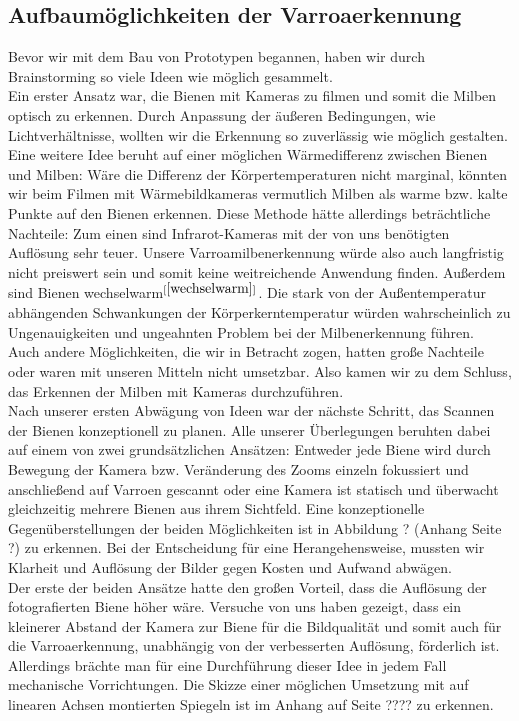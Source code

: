 \documentclass[11pt,a4paper]{article}
\newcommand{\bibRef}[1]{\hyperlink{#1}{$^{[\ref*{#1}{}]}$}}
\begin{document}
\subsection{Aufbaumöglichkeiten der Varroaerkennung}
Bevor wir mit dem Bau von Prototypen begannen, haben wir durch Brainstorming so viele Ideen wie möglich gesammelt.\\
Ein erster Ansatz war, die Bienen mit Kameras zu filmen und somit die Milben optisch zu erkennen. Durch Anpassung der äußeren Bedingungen, wie Lichtverhältnisse, wollten wir die Erkennung so zuverlässig wie möglich gestalten.\\
Eine weitere Idee beruht auf einer möglichen Wärmedifferenz zwischen Bienen und Milben: Wäre die Differenz der Körpertemperaturen nicht marginal, könnten wir beim Filmen mit Wärmebildkameras vermutlich Milben als warme bzw. kalte Punkte auf den Bienen erkennen. Diese Methode hätte allerdings beträchtliche Nachteile: Zum einen sind Infrarot-Kameras mit der von uns benötigten Auflösung sehr teuer. Unsere Varroamilbenerkennung würde also auch langfristig nicht preiswert sein und somit keine weitreichende Anwendung finden. Außerdem sind Bienen wechselwarm\bibRef{wechselwarm}. Die stark von der Außentemperatur abhängenden Schwankungen der Körperkerntemperatur würden wahrscheinlich zu Ungenauigkeiten und ungeahnten Problem bei der Milbenerkennung führen.\\
Auch andere Möglichkeiten, die wir in Betracht zogen, hatten große Nachteile oder waren mit unseren Mitteln nicht umsetzbar. Also kamen wir zu dem Schluss, das Erkennen der Milben mit Kameras durchzuführen.\\
Nach unserer ersten Abwägung von Ideen war der nächste Schritt, das Scannen der Bienen konzeptionell zu planen. Alle unserer Überlegungen beruhten dabei auf einem von zwei grundsätzlichen Ansätzen: Entweder jede Biene wird durch Bewegung der Kamera bzw. Veränderung des Zooms einzeln fokussiert und anschließend auf Varroen gescannt oder eine Kamera ist statisch und überwacht gleichzeitig mehrere Bienen aus ihrem Sichtfeld. Eine konzeptionelle Gegenüberstellungen der beiden Möglichkeiten ist in Abbildung ? (Anhang Seite ?) zu erkennen. Bei der Entscheidung für eine Herangehensweise, mussten wir Klarheit und Auflösung der Bilder gegen Kosten und Aufwand abwägen.\\
Der erste der beiden Ansätze hatte den großen Vorteil, dass die Auflösung der fotografierten Biene höher wäre. Versuche von uns haben gezeigt, dass ein kleinerer Abstand der Kamera zur Biene für die Bildqualität und somit auch für die Varroaerkennung, unabhängig von der verbesserten Auflösung, förderlich ist. Allerdings brächte man für eine Durchführung dieser Idee in jedem Fall mechanische Vorrichtungen. Die Skizze einer möglichen Umsetzung mit auf linearen Achsen montierten Spiegeln ist im Anhang auf Seite ???? zu erkennen.\\
\end{document}
